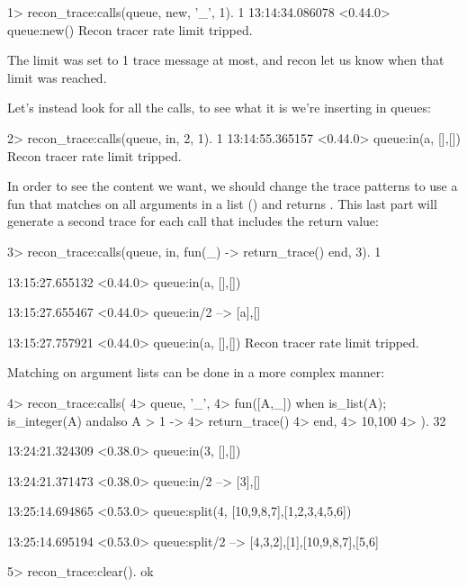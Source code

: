\begin{VerbatimEshell}
1> recon_trace:calls({queue, new, '_'}, 1).
1
13:14:34.086078 <0.44.0> queue:new()
Recon tracer rate limit tripped.
\end{VerbatimEshell}

The limit was set to 1 trace message at most, and recon let us know when that limit was reached.

Let's instead look for all the  calls, to see what it is we're inserting in queues:

\begin{VerbatimEshell}
2> recon_trace:calls({queue, in, 2}, 1).
1
13:14:55.365157 <0.44.0> queue:in(a, {[],[]})
Recon tracer rate limit tripped.
\end{VerbatimEshell}

In order to see the content we want, we should change the trace patterns to use a fun that matches on all arguments in a list (\term{\_}) and returns . This last part will generate a second trace for each call that includes the return value:

\begin{VerbatimEshell}
3> recon_trace:calls({queue, in, fun(_) -> return_trace() end}, 3).
1

13:15:27.655132 <0.44.0> queue:in(a, {[],[]})

13:15:27.655467 <0.44.0> queue:in/2 --> {[a],[]}

13:15:27.757921 <0.44.0> queue:in(a, {[],[]})
Recon tracer rate limit tripped.
\end{VerbatimEshell}

Matching on argument lists can be done in a more complex manner:

\begin{VerbatimEshell}
4> recon_trace:calls(
4>   {queue, '_',
4>    fun([A,_]) when is_list(A); is_integer(A) andalso A > 1 ->
4>        return_trace()
4>    end},
4>   {10,100}
4> ).
32

13:24:21.324309 <0.38.0> queue:in(3, {[],[]})

13:24:21.371473 <0.38.0> queue:in/2 --> {[3],[]}

13:25:14.694865 <0.53.0> queue:split(4, {[10,9,8,7],[1,2,3,4,5,6]})

13:25:14.695194 <0.53.0> queue:split/2 --> {{[4,3,2],[1]},{[10,9,8,7],[5,6]}}

5> recon_trace:clear().
ok
\end{VerbatimEshell}

